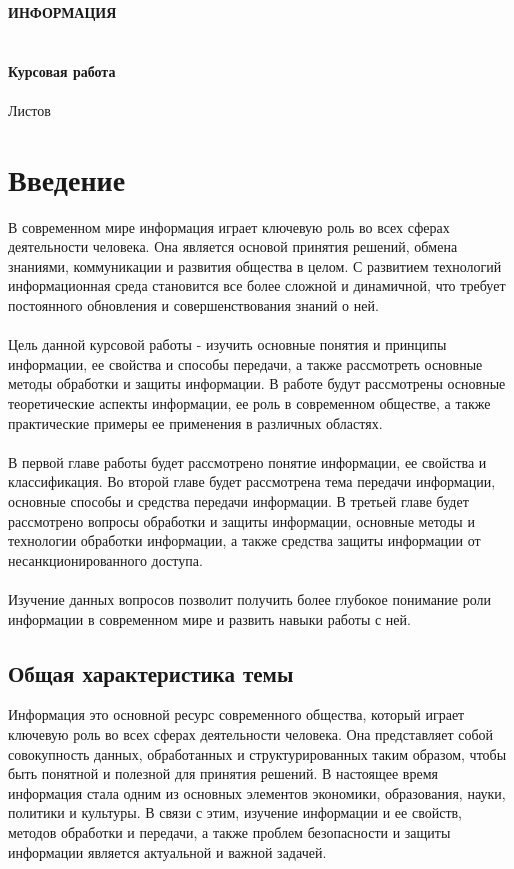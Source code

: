 \documentclass{article}
\begin{document}
\raggedright
\fontsize{14}{16}\selectfont
\thispagestyle{empty}
\clearpage
{}
\bigskip
\begin{center}
\topskip=0pt
\vspace*{\fill}
\textbf{
ИНФОРМАЦИЯ~\\
~\\
~\\
Курсовая работа\\
}
~\\
Листов \ztotpages\\
\vspace*{\fill}
\end{center}
\begin{center}
\end{center}
\newpage
\tableofcontents
\newpage

\newpage
\section{Введение}
В современном мире информация играет ключевую роль во всех сферах деятельности человека. Она является основой принятия решений, обмена знаниями, коммуникации и развития общества в целом. С развитием технологий информационная среда становится все более сложной и динамичной, что требует постоянного обновления и совершенствования знаний о ней.\\
~\\
Цель данной курсовой работы - изучить основные понятия и принципы информации, ее свойства и способы передачи, а также рассмотреть основные методы обработки и защиты информации. В работе будут рассмотрены основные теоретические аспекты информации, ее роль в современном обществе, а также практические примеры ее применения в различных областях.\\
~\\
В первой главе работы будет рассмотрено понятие информации, ее свойства и классификация. Во второй главе будет рассмотрена тема передачи информации, основные способы и средства передачи информации. В третьей главе будет рассмотрено вопросы обработки и защиты информации, основные методы и технологии обработки информации, а также средства защиты информации от несанкционированного доступа.\\
~\\
Изучение данных вопросов позволит получить более глубокое понимание роли информации в современном мире и развить навыки работы с ней.
\subsection{Общая характеристика темы}
Информация  это основной ресурс современного общества, который играет ключевую роль во всех сферах деятельности человека. Она представляет собой совокупность данных, обработанных и структурированных таким образом, чтобы быть понятной и полезной для принятия решений. В настоящее время информация стала одним из основных элементов экономики, образования, науки, политики и культуры. В связи с этим, изучение информации и ее свойств, методов обработки и передачи, а также проблем безопасности и защиты информации является актуальной и важной задачей.
\end{document}
